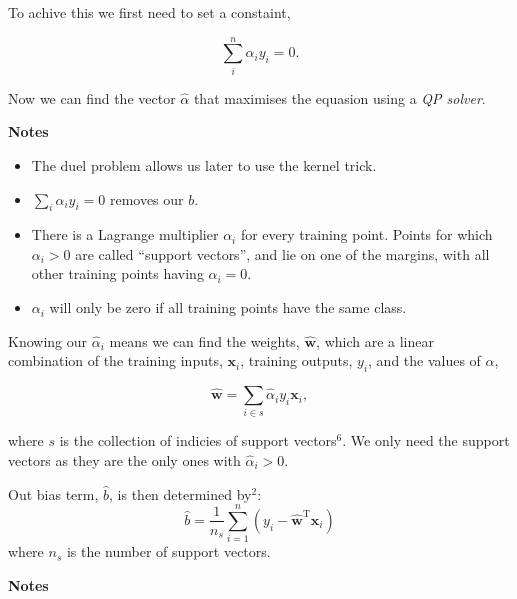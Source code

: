 \documentclass[11pt]{article}
\providecommand{\tightlist}{%
      \setlength{\itemsep}{0pt}\setlength{\parskip}{0pt}}
\begin{document}
To achive this we first need to set a constaint,

\[\sum^n_i\alpha_iy_i = 0.\]

Now we can find the vector \(\hat\alpha\) that maximises the equasion
using a \emph{QP solver}.

    \textbf{Notes}

\begin{itemize}
\tightlist
\item
  The duel problem allows us later to use the kernel trick.
\item
  \(\sum_i\alpha_iy_i = 0\) removes our \(b\).
\item
  There is a Lagrange multiplier \(\alpha_i\) for every training point.
  Points for which \(\alpha_i > 0\) are called ``support vectors'', and
  lie on one of the margins, with all other training points having
  \(\alpha_i = 0\).
\item
  \(\alpha_i\) will only be zero if all training points have the same
  class.
\end{itemize}

    Knowing our \(\hat\alpha_i\) means we can find the weights,
\(\mathbf{\hat w}\), which are a linear combination of the training
inputs, \(\mathbf{x}_i\), training outputs, \(y_i\), and the values of
\(\alpha\),

\[\mathbf{\hat w} = \sum_{i \in s}\hat\alpha_iy_i\mathbf{x}_i,\]

where \(s\) is the collection of indicies of support vectors\(^6\). We
only need the support vectors as they are the only ones with
\(\hat\alpha_i > 0\).

Out bias term, \(\hat b\), is then determined by\(^2\): \[
\hat b = \frac{1}{n_s}\sum^n_{i =1}\left(y_i-\mathbf{\hat w}^{\mathrm T}\mathbf{x}_i\right)
\] where \(n_s\) is the number of support vectors.

    \textbf{Notes}
\end{document}
